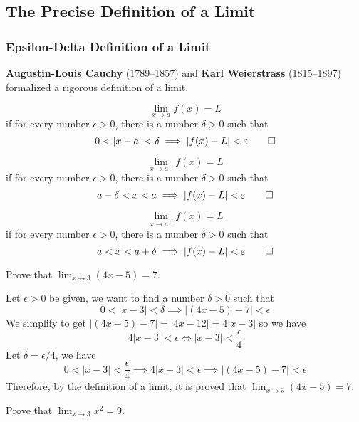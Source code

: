 \subsection{The Precise Definition of a Limit}

\subsubsection{Epsilon-Delta Definition of a Limit}
\textbf{Augustin-Louis Cauchy} (1789--1857) and \textbf{Karl Weierstrass}
(1815--1897) formalized a rigorous definition of a limit.
\begin{definition}
    \[\lim_{x\to a}f(x)=L\] if for every number \(\epsilon>0\), there is a
    number \(\delta>0\) such that
    \[0<|x-a|<\delta \implies |f(x)-L|<\epsilon\qedhere\]
\end{definition}
\begin{definition}
    \[\lim_{x\to a^-}f(x)=L\] if for every number \(\epsilon>0\), there is a
    number \(\delta>0\) such that
    \[a-\delta<x<a \implies |f(x)-L|<\epsilon\qedhere\]
\end{definition}
\begin{definition}
    \[\lim_{x\to a^+}f(x)=L\] if for every number \(\epsilon>0\), there is a
    number \(\delta>0\) such that
    \[a<x<a+\delta \implies |f(x)-L|<\epsilon\qedhere\]
\end{definition}
\begin{problem}
    Prove that \(\displaystyle{\lim_{x\to 3}(4x-5)=7}\).
\end{problem}
\begin{solution}
    Let \(\epsilon>0\) be given, we want to find a number \(\delta>0\) such
    that \[0<|x-3|<\delta \implies|(4x-5)-7|<\epsilon\]
    We simplify to get \(|(4x-5)-7|=|4x-12|=4|x-3|\) so we have
    \[4|x-3|<\epsilon \iff |x-3|<\frac{\epsilon}{4}\]
    Let \(\delta=\epsilon/4\), we have
    \[0<|x-3|<\frac{\epsilon}{4} \implies4|x-3|<\epsilon \implies
    |(4x-5)-7|<\epsilon\]
    Therefore, by the definition of a limit, it is proved that
    \(\displaystyle{\lim_{x\to 3}(4x-5)=7}\).
\end{solution}
\begin{problem}
    Prove that \(\displaystyle{\lim_{x\to 3}x^2=9}\).
\end{problem}
